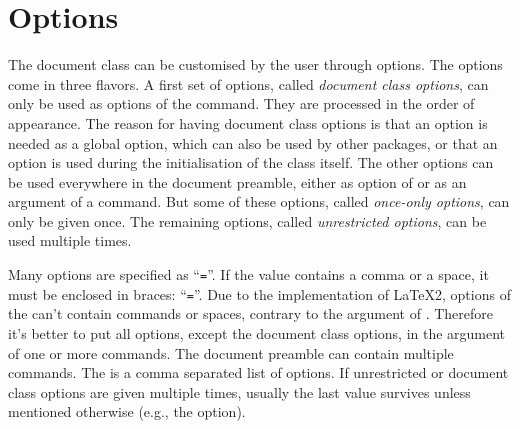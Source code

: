 \section{Options}\label{sec:options}
The document class can be customised by the user through options. The
options come in three flavors. A first set of options, called
\emph{document class options}, can only be used as options of the
 command. They are processed in the order of appearance.
The reason for having document class options is that an option is needed as
a global option, which can also be used by other packages, or that an
option is used during the initialisation of the class itself. The other
options can be used everywhere in the document preamble, either as
option of  or as an argument of a  command. But
some of these options, called \emph{once-only options}, can only be given
once. The remaining options, called \emph{unrestricted options}, can be
used multiple times.

Many options are specified as ``\texttt{=}''. If the
value contains a comma or a space, it must be enclosed in braces:
``\texttt{=}''. Due to the implementation of LaTeX2,
options of the  can't contain commands or spaces,
contrary to the argument of \label{com:setup}. Therefore it's
better to put all options, except the document class options, in the
argument of one or more  commands. The document preamble can
contain multiple  commands. The
 is a comma separated list of options. If unrestricted or
document class options are given multiple times, usually the last value
survives unless mentioned otherwise (e.g., the  option).

